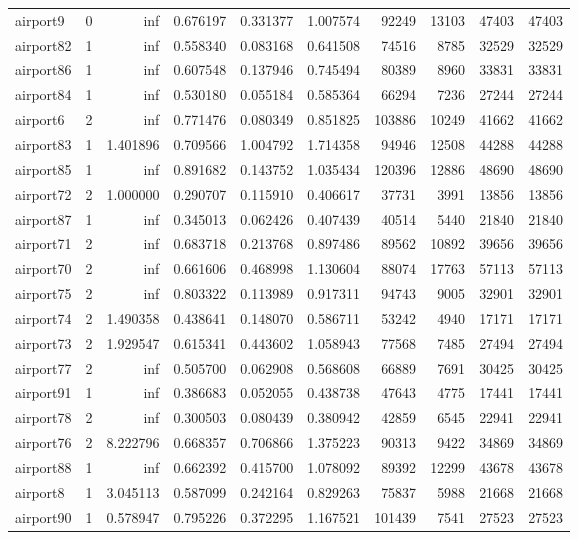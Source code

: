 \documentclass[../../../thesis.tex]{subfiles}
\begin{document}
\begin{longtable}{|l|r|r|r|r|r|r|r|r|r|}
airport9 & 0 & inf & 0.676197 & 0.331377 & 1.007574 & 92249 & 13103 & 47403 & 47403 \\
airport82 & 1 & inf & 0.558340 & 0.083168 & 0.641508 & 74516 & 8785 & 32529 & 32529 \\
airport86 & 1 & inf & 0.607548 & 0.137946 & 0.745494 & 80389 & 8960 & 33831 & 33831 \\
airport84 & 1 & inf & 0.530180 & 0.055184 & 0.585364 & 66294 & 7236 & 27244 & 27244 \\
airport6 & 2 & inf & 0.771476 & 0.080349 & 0.851825 & 103886 & 10249 & 41662 & 41662 \\
airport83 & 1 & 1.401896 & 0.709566 & 1.004792 & 1.714358 & 94946 & 12508 & 44288 & 44288 \\
airport85 & 1 & inf & 0.891682 & 0.143752 & 1.035434 & 120396 & 12886 & 48690 & 48690 \\
airport72 & 2 & 1.000000 & 0.290707 & 0.115910 & 0.406617 & 37731 & 3991 & 13856 & 13856 \\
airport87 & 1 & inf & 0.345013 & 0.062426 & 0.407439 & 40514 & 5440 & 21840 & 21840 \\
airport71 & 2 & inf & 0.683718 & 0.213768 & 0.897486 & 89562 & 10892 & 39656 & 39656 \\
airport70 & 2 & inf & 0.661606 & 0.468998 & 1.130604 & 88074 & 17763 & 57113 & 57113 \\
airport75 & 2 & inf & 0.803322 & 0.113989 & 0.917311 & 94743 & 9005 & 32901 & 32901 \\
airport74 & 2 & 1.490358 & 0.438641 & 0.148070 & 0.586711 & 53242 & 4940 & 17171 & 17171 \\
airport73 & 2 & 1.929547 & 0.615341 & 0.443602 & 1.058943 & 77568 & 7485 & 27494 & 27494 \\
airport77 & 2 & inf & 0.505700 & 0.062908 & 0.568608 & 66889 & 7691 & 30425 & 30425 \\
airport91 & 1 & inf & 0.386683 & 0.052055 & 0.438738 & 47643 & 4775 & 17441 & 17441 \\
airport78 & 2 & inf & 0.300503 & 0.080439 & 0.380942 & 42859 & 6545 & 22941 & 22941 \\
airport76 & 2 & 8.222796 & 0.668357 & 0.706866 & 1.375223 & 90313 & 9422 & 34869 & 34869 \\
airport88 & 1 & inf & 0.662392 & 0.415700 & 1.078092 & 89392 & 12299 & 43678 & 43678 \\
airport8 & 1 & 3.045113 & 0.587099 & 0.242164 & 0.829263 & 75837 & 5988 & 21668 & 21668 \\
airport90 & 1 & 0.578947 & 0.795226 & 0.372295 & 1.167521 & 101439 & 7541 & 27523 & 27523 \\

\end{longtable}
\end{document}
